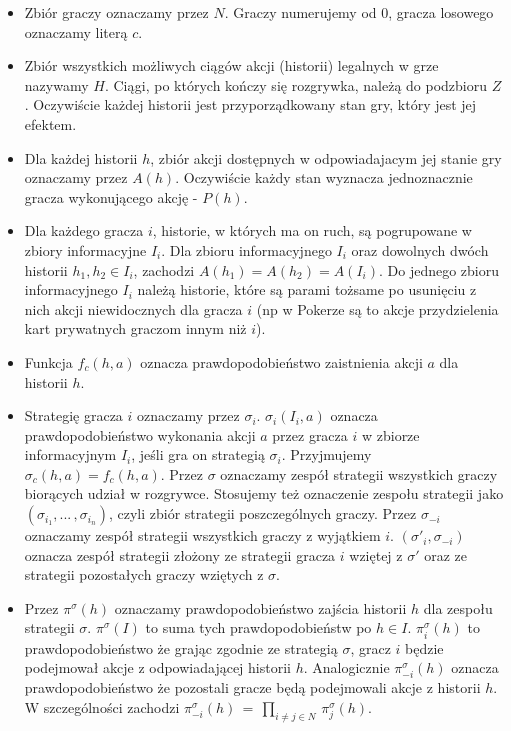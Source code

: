 \documentclass[licencjacka]{pracamgr}
\begin{document}
\begin{itemize}

\item Zbiór graczy oznaczamy przez $N$. Graczy numerujemy od $0$, gracza losowego oznaczamy literą $c$.
\item Zbiór wszystkich możliwych ciągów akcji (historii) legalnych w grze nazywamy $H$. Ciągi, po których kończy
      się rozgrywka, należą do podzbioru $Z$. Oczywiście każdej historii jest przyporządkowany stan gry, który
      jest jej efektem.
\item Dla każdej historii $h$, zbiór akcji dostępnych w odpowiadajacym jej stanie gry oznaczamy przez $A(h)$. Oczywiście
      każdy stan wyznacza jednoznacznie gracza wykonującego akcję - $P(h)$.
\item Dla każdego gracza $i$, historie, w których ma on ruch, są pogrupowane w zbiory informacyjne $I_i$. Dla zbioru
      informacyjnego $I_i$ oraz dowolnych dwóch historii $h_1, h_2 \in I_i$, zachodzi $A(h_1) = A(h_2) = A(I_i)$. Do jednego
      zbioru informacyjnego $I_i$ należą historie, które są parami tożsame po usunięciu z nich akcji niewidocznych dla gracza $i$
      (np w Pokerze są to akcje przydzielenia kart prywatnych graczom innym niż $i$).
\item Funkcja $f_c(h, a)$ oznacza prawdopodobieństwo zaistnienia akcji $a$ dla historii $h$.
\item Strategię gracza $i$ oznaczamy przez $\sigma_i$. $\sigma_i(I_i, a)$ oznacza prawdopodobieństwo wykonania akcji $a$ przez
      gracza $i$ w zbiorze informacyjnym $I_i$, jeśli gra on strategią $\sigma_i$. Przyjmujemy $\sigma_c(h, a) = f_c(h, a)$.
      Przez $\sigma$ oznaczamy zespół strategii wszystkich graczy biorących udział w rozgrywce. Stosujemy też oznaczenie
      zespołu strategii jako $(\sigma_{i_1}, ... \, , \sigma_{i_n})$, czyli zbiór strategii poszczególnych graczy. Przez $\sigma_{-i}$ oznaczamy
      zespół strategii wszystkich graczy z wyjątkiem $i$. $(\sigma'_i, \sigma_{-i})$ oznacza zespół strategii złożony ze strategii
      gracza $i$ wziętej z $\sigma'$ oraz ze strategii pozostałych graczy wziętych z $\sigma$.
\item Przez $\pi^{\sigma}(h)$ oznaczamy prawdopodobieństwo zajścia historii $h$ dla zespołu strategii $\sigma$.
      $\pi^{\sigma}(I)$ to suma tych prawdopodobieństw po $h \in I$. $\pi_i^{\sigma}(h)$ to prawdopodobieństwo że grając
      zgodnie ze strategią $\sigma$, gracz $i$ będzie podejmował akcje z odpowiadającej historii $h$. Analogicznie
      $\pi_{-i}^{\sigma}(h)$ oznacza prawdopodobieństwo że pozostali gracze będą podejmowali akcje z historii $h$. W szczególności
      zachodzi $\pi_{-i}^{\sigma}(h) \, = \, \prod\limits_{i \neq j \in N} \, \pi_j^{\sigma}(h)$.
\end{itemize}
\end{document}
